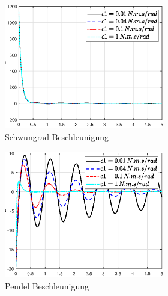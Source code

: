 \begin{figure}
\begin{figure}
\begin{subfigure}[b]{0.49 \linewidth}
        \includegraphics[width=\linewidth]{Bilder/5_sensi/fig/c1/phi_punkt_punkt.eps}
        \caption{Schwungrad Beschleunigung}
        \label{fig:c1_phi_punkt_punkt}
    \end{subfigure}
    \begin{subfigure}[b]{0.49 \linewidth}
        \includegraphics[width=\linewidth]{Bilder/5_sensi/fig/c1/theta_punkt_punkt.eps}
        \caption{Pendel Beschleunigung}
        \label{fig:c1_theta_punkt_punkt}
    \end{subfigure}
    \begin{subfigure}[b]{0.49\linewidth}

\end{subfigure}
\end{figure}
\end{figure}
